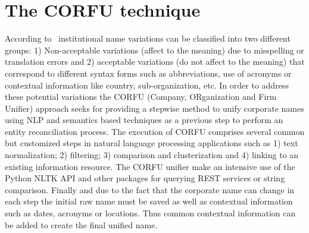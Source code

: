 \documentclass[1p,12pt]{elsarticle}
\begin{document}
 \section{The CORFU technique}
According to~\citep{Galvez2006,Morillo:2013:TAA:2424697.2424727} institutional name variations can be 
classified into two different groups: 1) Non-acceptable variations (affect to the meaning) due to misspelling or translation errors and 
2) acceptable variations (do not affect to the meaning) that correspond to different syntax forms such as abbreviations, use of acronyms or contextual 
information like country, sub-organization, etc. In order to address these potential variations the CORFU (Company, ORganization and Firm Unifier) approach 
seeks for providing a stepwise method to unify corporate names using NLP and semantics based techniques as a previous step to perform 
an entity reconciliation process. The execution of CORFU comprises several common but customized steps in natural language processing applications such as 
1) text normalization; 2) filtering; 3) comparison and clusterization and 4) linking to an existing information resource. The CORFU unifier 
make an intensive use of the Python NLTK API and other packages for querying REST services or string comparison. Finally and 
due to the fact that the corporate name can change in each step the initial raw name must be saved as well as contextual information such as dates, acronyms or locations. 
Thus common contextual information can be added to create the final unified name.
\end{document}
